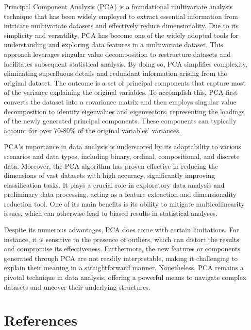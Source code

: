 \documentclass[
  letterpaper,
  DIV=11,
  numbers=noendperiod]{scrreprt}
\begin{document}
Principal Component Analysis (PCA) is a foundational multivariate
analysis technique that has been widely employed to extract essential
information from intricate multivariate datasets and effectively reduce
dimensionality. Due to its simplicity and versatility, PCA has become
one of the widely adopted tools for understanding and exploring data
features in a multivariate dataset. This approach leverages singular
value decomposition to restructure datasets and facilitates subsequent
statistical analysis. By doing so, PCA simplifies complexity,
eliminating superfluous details and redundant information arising from
the original dataset. The outcome is a set of principal components that
capture most of the variance explaining the original variables. To
accomplish this, PCA first converts the dataset into a covariance matrix
and then employs singular value decomposition to identify eigenvalues
and eigenvectors, representing the loadings of the newly generated
principal components. These components can typically account for over
70-80\% of the original variables' variances.

PCA's importance in data analysis is underscored by its adaptability to
various scenarios and data types, including binary, ordinal,
compositional, and discrete data. Moreover, the PCA algorithm has proven
effective in reducing the dimensions of vast datasets with high
accuracy, significantly improving classification tasks. It plays a
crucial role in exploratory data analysis and preliminary data
processing, acting as a feature extraction and dimensionality reduction
tool. One of its main benefits is its ability to mitigate
multicollinearity issues, which can otherwise lead to biased results in
statistical analyses.

Despite its numerous advantages, PCA does come with certain limitations.
For instance, it is sensitive to the presence of outliers, which can
distort the results and compromise its effectiveness. Furthermore, the
new features or components generated through PCA are not readily
interpretable, making it challenging to explain their meaning in a
straightforward manner. Nonetheless, PCA remains a pivotal technique in
data analysis, offering a powerful means to navigate complex datasets
and uncover their underlying structures.


\hypertarget{references}{%
\chapter{References}\label{references}}
\end{document}
